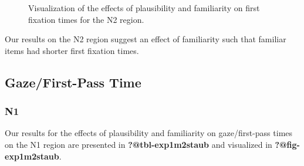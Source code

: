 \documentclass[
  letterpaper,
  DIV=11,
  numbers=noendperiod,
  nottoc]{scrreprt}
\begin{document}
\begin{figure}[htbp]


\caption{\label{fig-firstfixn2staub}Visualization of the effects of
plausibility and familiarity on first fixation times for the N2 region.}

\end{figure}%

Our results on the N2 region suggest an effect of familiarity such that
familiar items had shorter first fixation times.

\subsection{Gaze/First-Pass Time}\label{gazefirst-pass-time-2}

\subsubsection{N1}\label{n1-5}

Our results for the effects of plausibility and familiarity on
gaze/first-pass times on the N1 region are presented in
\textbf{?@tbl-exp1m2staub} and visualized in \textbf{?@fig-exp1m2staub}.
\end{document}
